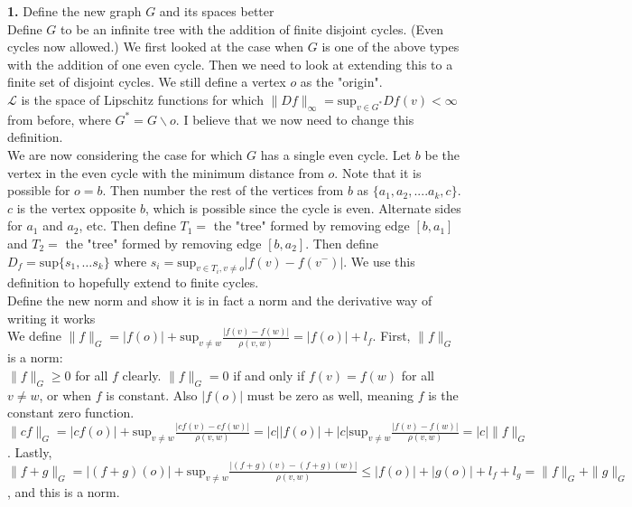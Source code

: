 \documentclass[11 pt]{report}
\begin{document}
\textbf{1.} Define the new graph $G$ and its spaces better \\

\indent \indent Define $G$ to be an infinite tree with the addition of finite disjoint cycles. (Even cycles now allowed.) We first looked at the case when $G$ is one of the above types with the addition of one even cycle. Then we need to look at extending this to a finite set of disjoint cycles. We still define a vertex $o$ as the "origin". \\

\indent \indent $\mathcal{L}$ is the space of Lipschitz functions for which $\|Df\|_\infty = \text{sup}_{v \in G^*} Df(v) < \infty$ from before, where $G^* = G \backslash o$. I believe that we now need to change this definition. \\

\indent \indent We are now considering the case for which $G$ has a single even cycle. Let $b$ be the vertex in the even cycle with the minimum distance from $o$. Note that it is possible for $o=b$. Then number the rest of the vertices from $b$ as $\{a_1, a_2, ....a_k, c\}$. $c$ is the vertex opposite $b$, which is possible since the cycle is even. Alternate sides for $a_1$ and $a_2$, etc. Then define $T_1 = $ the "tree" formed by removing edge $[b, a_1]$ and $T_2 =$ the "tree" formed by removing edge $[b,a_2]$. Then define $D_f = \text{sup}\{s_1, \dots s_k\}$ where $s_i = \text{sup}_{v \in T_i, v \neq o} |f(v) - f(v^-)|$. We use this definition to hopefully extend to finite cycles. \\

\indent Define the new norm and show it is in fact a norm and the derivative way of writing it works\\

\indent \indent We define $\| f\|_G = |f(o)| + \text{sup}_{v \neq w} \frac{|f(v)-f(w)|}{\rho(v,w)} = |f(o)| + l_f$.  First, $\|f\|_G$ is a norm:\\

\indent \indent \indent $\|f\|_G \ge 0$ for all $f$ clearly. $\|f\|_G=0$ if and only if $f(v) = f(w)$ for all $v\neq w$, or when $f$ is constant. Also $|f(o)|$ must be zero as well, meaning $f$ is the constant zero function.  $\|cf\|_G = |cf(o)| + \text{sup}_{v \neq w} \frac{|cf(v)-cf(w)|}{\rho(v,w)} = |c||f(o)| + |c|\text{sup}_{v\neq w} \frac{|f(v)-f(w)|}{\rho (v,w)} = |c|\|f\|_G$.  Lastly, $\|f+g\|_G=|(f+g)(o)|+\text{sup}_{v\neq w} \frac{|(f+g)(v) - (f+g)(w)|}{\rho(v,w)} \le |f(o)| + |g(o)| + l_f + l_g = \|f\|_G + \|g\|_G$, and this is a norm. \\
\end{document}
